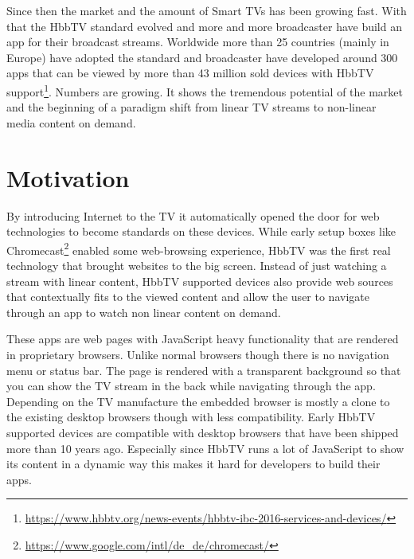Since then the market and the amount of Smart TVs has been growing fast. With that the HbbTV standard evolved
and more and more broadcaster have build an app for their broadcast streams. Worldwide more than 25 countries
(mainly in Europe) have adopted the standard and broadcaster have developed around 300 apps that can
be viewed by more than 43 million sold devices with HbbTV support\footnote{\url{https://www.hbbtv.org/news-events/hbbtv-ibc-2016-services-and-devices/}}.
Numbers are growing. It shows the tremendous potential of the market and the beginning of a paradigm shift
from linear TV streams to non-linear media content on demand.

\section{Motivation\label{sec:motivation}}

By introducing Internet to the TV it automatically opened the door for web technologies to become standards
on these devices. While early setup boxes like Chromecast\footnote{\url{https://www.google.com/intl/de_de/chromecast/}}
enabled some web-browsing experience, HbbTV was the first real technology that brought websites to the big screen.
Instead of just watching a stream with linear content, HbbTV supported devices also provide web sources that
contextually fits to the viewed content and allow the user to navigate through an app to watch non linear content
on demand.

These apps are web pages with JavaScript heavy functionality that are rendered in proprietary browsers. Unlike
normal browsers though there is no navigation menu or status bar. The page is rendered with a transparent background
so that you can show the TV stream in the back while navigating through the app. Depending on the TV manufacture
the embedded browser is mostly a clone to the existing desktop browsers though with less compatibility.
Early HbbTV supported devices are compatible with desktop browsers that have been shipped more than 10 years ago.
Especially since HbbTV runs a lot of JavaScript to show its content in a dynamic way this makes it hard for
developers to build their apps.

